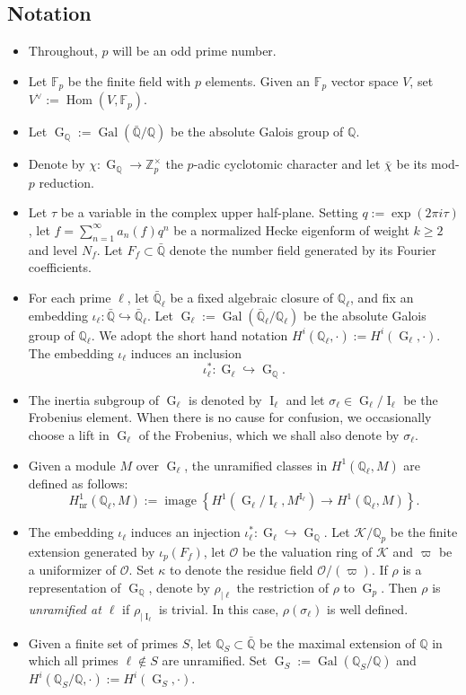 \documentclass[table]{amsart}
\newcommand{\cK}{\mathcal{K}}
\newcommand{\Z}{\mathbb{Z}}
\newcommand{\Q}{\mathbb{Q}}
\newcommand{\F}{\mathbb{F}}
\newcommand{\cO}{\mathcal{O}}
\newcommand{\op}[1]{\operatorname{#1}}
\numberwithin{equation}{section}
\begin{document}
\subsection{Notation}
\begin{itemize}
    \item Throughout, \( p \) will be an odd prime number.  
    \item Let $\F_p$ be the finite field with $p$ elements. Given an $\F_p$ vector space $V$, set $V^\vee:=\op{Hom}\left(V, \F_p\right)$.
    \item Let \( \op{G}_\Q := \op{Gal}(\bar{\Q}/\Q) \) be the absolute Galois group of \( \Q \).
    \item Denote by $\chi:\op{G}_{\Q}\rightarrow \Z_p^\times$ the $p$-adic cyclotomic character and let $\bar{\chi}$ be its mod-$p$ reduction.
    \item Let \( \tau \) be a variable in the complex upper half-plane. Setting \( q := \exp(2\pi i \tau) \), let \( f = \sum_{n=1}^\infty a_n(f) q^n \) be a normalized Hecke eigenform of weight \( k \geq 2\) and level \( N_f \). Let \( F_f \subset \bar{\Q}\) denote the number field generated by its Fourier coefficients.
    \item For each prime \( \ell \), let \( \bar{\Q}_\ell \) be a fixed algebraic closure of \( \Q_\ell \), and fix an embedding $\iota_\ell: \bar{\Q} \hookrightarrow \bar{\Q}_\ell$. Let \( \op{G}_\ell := \op{Gal}(\bar{\Q}_\ell/\Q_\ell) \) be the absolute Galois group of \( \Q_\ell \). We adopt the short hand notation $H^i(\Q_\ell, \cdot):=H^i(\op{G}_\ell, \cdot)$. The embedding $\iota_\ell$ induces an inclusion 
    \[\iota_\ell^*: \op{G}_\ell\hookrightarrow \op{G}_\Q.\]
    \item The inertia subgroup of $\op{G}_\ell$ is denoted by $\op{I}_\ell$ and let $\sigma_\ell\in \op{G}_\ell/\op{I}_\ell$ be the Frobenius element. When there is no cause for confusion, we occasionally choose a lift in $\op{G}_\ell$ of the Frobenius, which we shall also denote by $\sigma_\ell$.
    \item Given a module $M$ over $\op{G}_\ell$, the unramified classes in $H^1(\Q_\ell, M)$ are defined as follows:
\[H^1_{\op{nr}}(\Q_\ell, M):=\op{image}\left\{ H^1(\op{G}_\ell/\op{I}_\ell, M^{\op{I}_\ell})\longrightarrow H^1(\Q_\ell, M)\right\}.\]
    \item The embedding \( \iota_\ell \) induces an injection \( \iota_\ell^* : \op{G}_\ell \hookrightarrow \op{G}_\Q \). Let $\cK/\Q_p$ be the finite extension generated by $\iota_p(F_f)$, let $\cO$ be the valuation ring of $\cK$ and $\varpi$ be a uniformizer of $\cO$. Set $\kappa$ to denote the residue field $\cO/(\varpi)$. If $\rho$ is a representation of $\op{G}_\Q$, denote by $\rho_{|\ell}$ the restriction of $\rho$ to $\op{G}_p$. Then $\rho$ is \emph{unramified at $\ell$} if $\rho_{|\op{I}_\ell}$ is trivial. In this case, $\rho(\sigma_\ell)$ is well defined.
    \item Given a finite set of primes $S$, let $\Q_S\subset \bar{\Q}$ be the maximal extension of $\Q$ in which all primes $\ell\notin S$ are unramified. Set $\op{G}_S:=\op{Gal}(\Q_S/\Q)$ and $H^i(\Q_S/\Q, \cdot):=H^i(\op{G}_S, \cdot)$.
\end{itemize}
\end{document}
